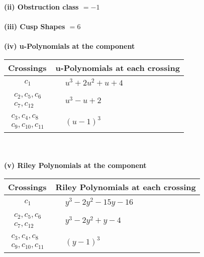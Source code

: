 \documentclass[1p]{elsarticle_modified}
\theoremstyle{definition}
\begin{document}
\flushleft \textbf{(ii) Obstruction class $= -1$}\\~\\
\flushleft \textbf{(iii) Cusp Shapes $= 6$}\\~\\
\newpage\renewcommand{\arraystretch}{1}
\flushleft \textbf{(iv) u-Polynomials at the component}\newline \\
\begin{tabular}{m{50pt}|m{274pt}}
Crossings & \hspace{64pt}u-Polynomials at each crossing \\
\hline $$\begin{aligned}c_{1}\end{aligned}$$&$\begin{aligned}
&u^3+2 u^2+u+4
\end{aligned}$\\
\hline $$\begin{aligned}c_{2},c_{5},c_{6}\\c_{7},c_{12}\end{aligned}$$&$\begin{aligned}
&u^3- u+2
\end{aligned}$\\
\hline $$\begin{aligned}c_{3},c_{4},c_{8}\\c_{9},c_{10},c_{11}\end{aligned}$$&$\begin{aligned}
&(u-1)^3
\end{aligned}$\\
\hline
\end{tabular}\\~\\
\newpage\renewcommand{\arraystretch}{1}
\flushleft \textbf{(v) Riley Polynomials at the component}\newline \\
\begin{tabular}{m{50pt}|m{274pt}}
Crossings & \hspace{64pt}Riley Polynomials at each crossing \\
\hline $$\begin{aligned}c_{1}\end{aligned}$$&$\begin{aligned}
&y^3-2 y^2-15 y-16
\end{aligned}$\\
\hline $$\begin{aligned}c_{2},c_{5},c_{6}\\c_{7},c_{12}\end{aligned}$$&$\begin{aligned}
&y^3-2 y^2+y-4
\end{aligned}$\\
\hline $$\begin{aligned}c_{3},c_{4},c_{8}\\c_{9},c_{10},c_{11}\end{aligned}$$&$\begin{aligned}
&(y-1)^3
\end{aligned}$\\
\hline
\end{tabular}\\~\\
\end{document}
